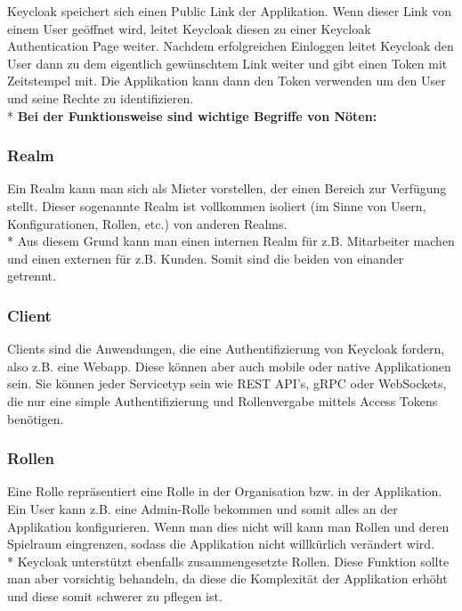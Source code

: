 Keycloak speichert sich einen Public Link der Applikation. Wenn dieser Link von einem User geöffnet wird, leitet Keycloak diesen zu einer Keycloak Authentication Page weiter.
Nachdem erfolgreichen Einloggen leitet Keycloak den User dann zu dem eigentlich gewünschtem Link weiter und gibt einen Token mit Zeitstempel mit.
Die Applikation kann dann den Token verwenden um den User und seine Rechte zu identifizieren. \cite{KeycloakMakeIT} \\*
\textbf{Bei der Funktionsweise sind wichtige Begriffe von Nöten:}

\subsubsection{Realm}
Ein Realm kann man sich als Mieter vorstellen, der einen Bereich zur Verfügung stellt. Dieser sogenannte Realm ist vollkommen isoliert (im Sinne von Usern, Konfigurationen, Rollen, etc.)
von anderen Realms. \\* Aus diesem Grund kann man einen internen Realm für z.B. Mitarbeiter machen und einen externen für z.B. Kunden. Somit sind die beiden von einander getrennt. \cite{KeyCloakCodex}

\subsubsection{Client}
Clients sind die Anwendungen, die eine Authentifizierung von Keycloak fordern, also z.B. eine Webapp. Diese können aber auch mobile oder native Applikationen sein.
Sie können jeder Servicetyp sein wie REST API's, gRPC oder WebSockets, die nur eine simple Authentifizierung und Rollenvergabe mittels Access Tokens benötigen. \cite{KeyCloakCodex}

\subsubsection{Rollen}
Eine Rolle repräsentiert eine Rolle in der Organisation bzw. in der Applikation. Ein User kann z.B. eine Admin-Rolle bekommen und somit alles an der Applikation konfigurieren.
Wenn man dies nicht will kann man Rollen und deren Spielraum eingrenzen, sodass die Applikation nicht willkürlich verändert wird. \\*
Keycloak unterstützt ebenfalls zusammengesetzte Rollen. Diese Funktion sollte man aber vorsichtig behandeln, da diese die Komplexität der Applikation erhöht und diese somit schwerer zu pflegen ist. \cite{KeyCloakCodex}

